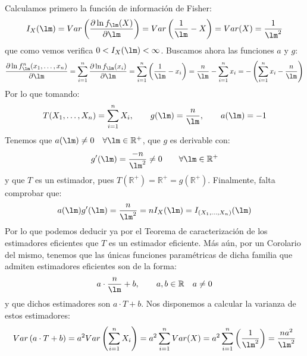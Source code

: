 \begin{ejercicio}
\begin{enumerate}[label=\alph*)]
            Calculamos primero la función de información de Fisher:
            \begin{equation*}
                I_X(\lm) = Var\left(\dfrac{\partial \ln f_\lm(X)}{\partial \lm}\right) = Var\left(\frac{1}{\lm}-X\right) = Var(X) = \frac{1}{\lm^2}
            \end{equation*}
            que como vemos verifica $0<I_X(\lm) <\infty$. Buscamos ahora las funciones $a$ y $g$:
            \begin{equation*}
                \dfrac{\partial \ln f_\lm^n(x_1, \ldots, x_n)}{\partial \lm} = \sum_{i=1}^{n}\dfrac{\partial \ln f_\lm(x_i)}{\partial \lm} = \sum_{i=1}^{n} \left(\frac{1}{\lm}-x_i\right) = \frac{n}{\lm} - \sum_{i=1}^{n}x_i = -\left(\sum_{i=1}^{n}x_i - \frac{n}{\lm}\right)
            \end{equation*}
            Por lo que tomando:
            \begin{equation*}
                T(X_1, \ldots, X_n) = \sum_{i=1}^{n} X_i, \qquad g(\lm) = \frac{n}{\lm}, \qquad a(\lm) = -1
            \end{equation*}
            Tenemos que $a(\lm) \neq 0 \quad \forall \lm\in \mathbb{R}^+$, que $g$ es derivable con:
            \begin{equation*}
                g'(\lm) = \frac{-n}{\lm^2} \neq 0 \qquad \forall \lm\in \mathbb{R}^+
            \end{equation*}
            y que $T$ es un estimador, pues $T(\mathbb{R}^+) = \mathbb{R}^+ = g(\mathbb{R}^+)$. Finalmente, falta comprobar que:
            \begin{equation*}
                a(\lm)g'(\lm) = \frac{n}{\lm^2} = nI_X(\lm) = I_{(X_1, \ldots, X_n)}(\lm)
            \end{equation*}
            Por lo que podemos deducir ya por el Teorema de caracterización de los estimadores eficientes que $T$ es un estimador eficiente. Más aún, por un Corolario del mismo, tenemos que las únicas funciones paramétricas de dicha familia que admiten estimadores eficientes son de la forma:
            \begin{equation*}
                a\cdot \frac{n}{\lm}+b, \qquad a,b\in \mathbb{R}\quad a\neq 0
            \end{equation*}
            y que dichos estimadores son $a\cdot T+b$. Nos disponemos a calcular la varianza de estos estimadores:
            \begin{equation*}
                Var\left(a\cdot T+b\right) = a^2 Var\left(\sum_{i=1}^{n}X_i\right) = a^2\sum_{i=1}^{n}Var(X) = a^2 \sum_{i=1}^{n} \left(\frac{1}{\lm^2}\right) = \frac{na^2}{\lm^2}

\end{equation*}
\end{enumerate}
\end{ejercicio}

